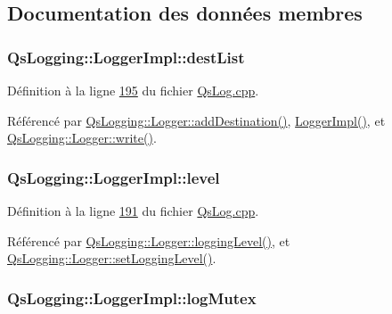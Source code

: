 \subsection{Documentation des données membres}
\hypertarget{classQsLogging_1_1LoggerImpl_acdbde93fec67bd0bcce8da1fc1080ece}{
\subsubsection[{dest\-List}]{\setlength{\rightskip}{0pt plus 5cm}Qs\-Logging\-::\-Logger\-Impl\-::dest\-List}}\label{classQsLogging_1_1LoggerImpl_acdbde93fec67bd0bcce8da1fc1080ece}


Définition à la ligne \hyperlink{QsLog_8cpp_source_l00195}{195} du fichier \hyperlink{QsLog_8cpp_source}{Qs\-Log.\-cpp}.



Référencé par \hyperlink{classQsLogging_1_1Logger_a76a32c839e837547b14bc5e523b4aa45}{Qs\-Logging\-::\-Logger\-::add\-Destination()}, \hyperlink{classQsLogging_1_1LoggerImpl_a97418676fcfcb2fb13c0ebbbae3ef184}{Logger\-Impl()}, et \hyperlink{classQsLogging_1_1Logger_ab9789bba5f1644a3b3b51606533aa20f}{Qs\-Logging\-::\-Logger\-::write()}.

\hypertarget{classQsLogging_1_1LoggerImpl_a4d3c9f4b81baa52df759b6d07bda0a69}{
\subsubsection[{level}]{\setlength{\rightskip}{0pt plus 5cm}Qs\-Logging\-::\-Logger\-Impl\-::level}}\label{classQsLogging_1_1LoggerImpl_a4d3c9f4b81baa52df759b6d07bda0a69}


Définition à la ligne \hyperlink{QsLog_8cpp_source_l00191}{191} du fichier \hyperlink{QsLog_8cpp_source}{Qs\-Log.\-cpp}.



Référencé par \hyperlink{classQsLogging_1_1Logger_a5e2b29cf6cd066f1e64eaa4db7373458}{Qs\-Logging\-::\-Logger\-::logging\-Level()}, et \hyperlink{classQsLogging_1_1Logger_aa34d1a0d83e180f15e23a03f9de872c6}{Qs\-Logging\-::\-Logger\-::set\-Logging\-Level()}.

\hypertarget{classQsLogging_1_1LoggerImpl_a8feaba4a7a7160106987943313804c35}{
\subsubsection[{log\-Mutex}]{\setlength{\rightskip}{0pt plus 5cm}Qs\-Logging\-::\-Logger\-Impl\-::log\-Mutex}}\label{classQsLogging_1_1LoggerImpl_a8feaba4a7a7160106987943313804c35}


